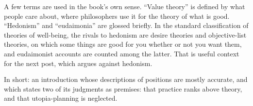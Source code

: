 \begin{afterword}
A few terms are used in the book's own sense. ``Value theory'' is defined by what people care about, where philosophers use it for the theory of what is good. ``Hedonism'' and ``eudaimonia'' are glossed briefly. In the standard classification of theories of well-being, the rivals to hedonism are desire theories and objective-list theories, on which some things are good for you whether or not you want them, and eudaimonist accounts are counted among the latter. That is useful context for the next post, which argues against hedonism.

In short: an introduction whose descriptions of positions are mostly accurate, and which states two of its judgments as premises: that practice ranks above theory, and that utopia-planning is neglected.
\end{afterword}
